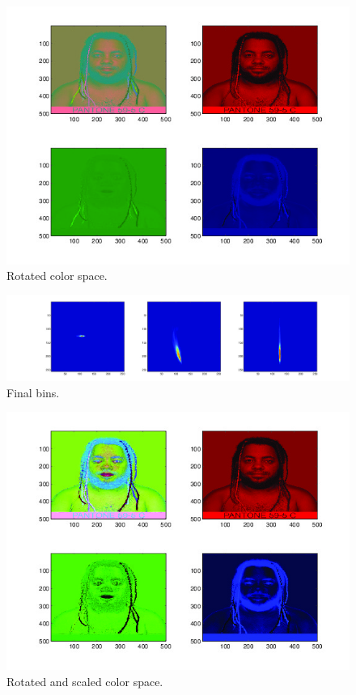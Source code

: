 \begin{figure}[h!]
  \centering
    \includegraphics[width=\textwidth]{Chapter4/Figs/rainbowmanRotated.jpg}
    \caption{Rotated color space.}
\end{figure}

\begin{figure}[h!]
  \centering
    \includegraphics[width=\textwidth]{Chapter4/Figs/binsFinal2.jpg}
    \caption{Final bins.}
\end{figure}

\begin{figure}[h!]
  \centering
    \includegraphics[width=\textwidth]{Chapter4/Figs/rainbowmanRotatedScaled.jpg}
    \caption{Rotated and scaled color space.}
\end{figure}

